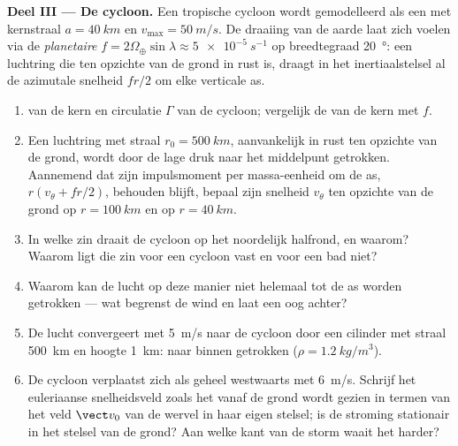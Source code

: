 \begin{problem}
\medskip
\noindent\textbf{Deel III --- De cycloon.}
Een tropische cycloon wordt gemodelleerd als een  met
kernstraal $a = \qty{40}{km}$ en $v_{\max} = \qty{50}{m/s}$. De draaiing van
de aarde laat zich voelen via de \emph{planetaire }
$f = 2\Omega_\oplus\sin\lambda
\approx \qty{5e-5}{s^{-1}}$ op breedtegraad
\qty{20}{\degree}: een luchtring die ten opzichte van de grond in rust is,
draagt in het inertiaalstelsel al de azimutale snelheid $fr/2$ om elke
verticale as.
\begin{enumerate}[resume]
  \item {} van de kern en circulatie $\Gamma$ van de cycloon;
        vergelijk de  van de kern met $f$.
  \item Een luchtring met straal $r_0 = \qty{500}{km}$, aanvankelijk in rust
        ten opzichte van de grond, wordt door de lage druk naar het
        middelpunt getrokken. Aannemend dat zijn impulsmoment per
        massa-eenheid om de as, $r(v_\theta + fr/2)$, behouden blijft,
        bepaal zijn snelheid $v_\theta$ ten opzichte van de grond op
        $r = \qty{100}{km}$ en op $r = \qty{40}{km}$.
  \item In welke zin draait de cycloon op het noordelijk halfrond, en
        waarom? Waarom ligt die zin voor een cycloon vast en voor een bad
        niet?
  \item Waarom kan de lucht op deze manier niet helemaal tot de as worden
        getrokken --- wat begrenst de wind en laat een oog achter?
  \item De lucht convergeert met \qty{5}{m/s} naar de cycloon door een
        cilinder met straal \qty{500}{km} en hoogte \qty{1}{km}: naar binnen
        getrokken  ($\rho = \qty{1.2}{kg/m^3}$).
  \item De cycloon verplaatst zich als geheel westwaarts met \qty{6}{m/s}.
        Schrijf het euleriaanse snelheidsveld zoals het vanaf de grond wordt
        gezien in termen van het veld $\vect v_0$ van de wervel in haar
        eigen stelsel; is de stroming stationair in het stelsel van de
        grond? Aan welke kant van de storm waait het harder?
\end{enumerate}


\end{problem}
